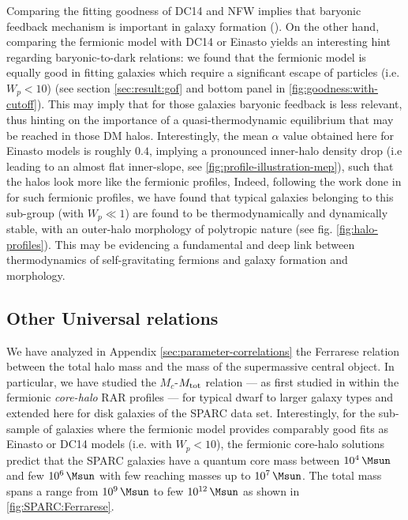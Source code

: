 Comparing the fitting goodness of DC14 and NFW implies that baryonic feedback mechanism is important in galaxy formation (). On the other hand, comparing the fermionic model with DC14 or Einasto yields an interesting hint regarding baryonic-to-dark relations: we found that the fermionic model is equally good in fitting galaxies which require a significant escape of particles (i.e. $W_p < 10$) (see section \ref{sec:result:gof} and bottom panel in \cref{fig:goodness:with-cutoff}). This may imply that for those galaxies baryonic feedback is less relevant, thus hinting on the importance of a quasi-thermodynamic equilibrium that may be reached in those DM halos. Interestingly, the mean $\alpha$ value obtained here for Einasto models is roughly $0.4$, implying a pronounced inner-halo density drop (i.e leading to an almost flat inner-slope, see \cref{fig:profile-illustration-mep}), such that the halos look more like the fermionic profiles,  Indeed, following the work done in \cite{2021MNRAS.502.4227A} for such fermionic profiles, we have found that typical galaxies belonging to this sub-group (with $W_p \ll 1$) are found to be thermodynamically and dynamically stable, with an outer-halo morphology of polytropic nature (see fig. \ref{fig:halo-profiles}). This may be evidencing a fundamental and deep link between thermodynamics of self-gravitating fermions and galaxy formation and morphology. 

\subsection{Other Universal relations}
We have analyzed in Appendix \ref{sec:parameter-correlations} the Ferrarese relation between the total halo mass and the mass of the supermassive central object. In particular, we have studied the $M_c$-$M_{\rm tot}$ relation --- as first studied in \citet{2019PDU....24..278A} within the fermionic \textit{core-halo} RAR profiles --- for typical dwarf to larger galaxy types and extended here for disk galaxies of the SPARC data set. Interestingly, for the sub-sample of galaxies where the fermionic model provides comparably good fits as Einasto or DC14 models (i.e. with $W_p < 10$), the fermionic core-halo solutions predict that the SPARC galaxies have a quantum core mass between $\SI{E4}{\Msun}$ and few $\SI{E6}{\Msun}$ with few reaching masses up to $\SI{E7}{\Msun}$. The total mass spans a range from $\SI{E9}{\Msun}$ to few $\SI{E12}{\Msun}$ as shown in \cref{fig:SPARC:Ferrarese}.

